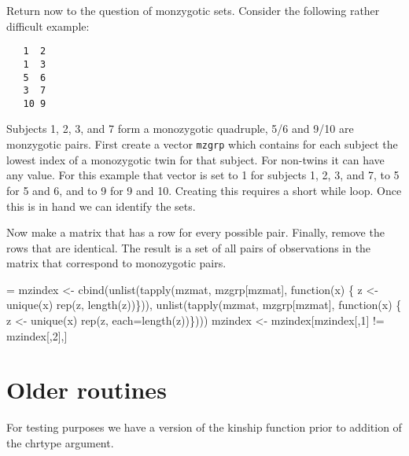 \documentclass{article}
\newcommand{\code}[1]{\texttt{#1}}
\begin{document}
Return now to the question of monzygotic sets.
Consider the following rather difficult example:
\begin{verbatim}
   1  2
   1  3
   5  6
   3  7
   10 9
\end{verbatim}
Subjects 1, 2, 3, and 7 form a monozygotic quadruple, 5/6 and 9/10 are
monzygotic pairs.  
First create a vector \code{mzgrp} which contains for each subject the
lowest index of a monozygotic twin for that subject.  
For non-twins it can have any value.  
For this example that vector is set to 1 for subjects 1, 2, 3, and 7,
to 5 for 5 and 6, and to 9 for 9 and 10.
Creating this requires a short while loop.
Once this is in hand we can identify the sets.
Now make a matrix that has a row for every possible pair.
Finally, remove the rows that are identical.
The result is a set of all pairs of observations in the matrix that
correspond to monozygotic pairs.
\begin{nwchunk}
=
 mzindex <- cbind(unlist(tapply(mzmat, mzgrp[mzmat], function(x) \{
                                 z <- unique(x)
                                 rep(z, length(z))\})),
                  unlist(tapply(mzmat, mzgrp[mzmat], function(x) \{
                                 z <- unique(x)
                                 rep(z, each=length(z))\})))
 mzindex <- mzindex[mzindex[,1] != mzindex[,2],]
\end{nwchunk}

\section{Older routines}
For testing purposes we have a version of the kinship function prior to
addition of the chrtype argument.
\end{document}
